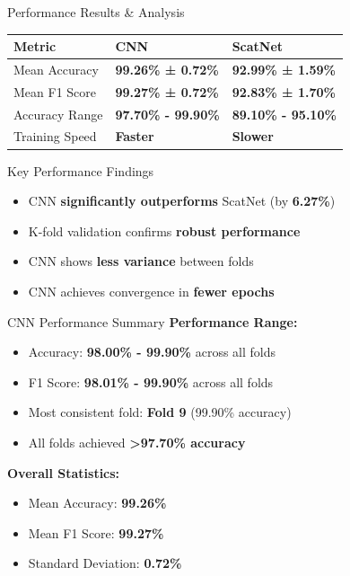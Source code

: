 \documentclass[aspectratio=169,8pt]{beamer}  %
\begin{document}
\begin{frame}{Performance Results \& Analysis}
\begin{table}
\begin{tabular}{lll}
\toprule
Metric & CNN & ScatNet \\
\midrule
Mean Accuracy & \textbf{99.26\% ± 0.72\%} & \textbf{92.99\% ± 1.59\%} \\
Mean F1 Score & \textbf{99.27\% ± 0.72\%} & \textbf{92.83\% ± 1.70\%} \\
Accuracy Range & \textbf{97.70\% - 99.90\%} & \textbf{89.10\% - 95.10\%} \\
Training Speed & \textbf{Faster} & \textbf{Slower} \\
\bottomrule
\end{tabular}
\end{table}

\begin{block}{Key Performance Findings}
\begin{itemize}
\item CNN \textbf{significantly outperforms} ScatNet (by \textbf{6.27\%})
\item K-fold validation confirms \textbf{robust performance}
\item CNN shows \textbf{less variance} between folds
\item CNN achieves convergence in \textbf{fewer epochs}
\end{itemize}
\end{block}
\end{frame}

\begin{frame}{CNN Performance Summary}
\textbf{Performance Range:}
\begin{itemize}
\item Accuracy: \textbf{98.00\% - 99.90\%} across all folds
\item F1 Score: \textbf{98.01\% - 99.90\%} across all folds
\item Most consistent fold: \textbf{Fold 9} (99.90\% accuracy)
\item All folds achieved \textbf{\textgreater{}97.70\% accuracy}
\end{itemize}

\textbf{Overall Statistics:}
\begin{itemize}
\item Mean Accuracy: \textbf{99.26\%}
\item Mean F1 Score: \textbf{99.27\%}
\item Standard Deviation: \textbf{0.72\%}
\end{itemize}
\end{frame}
\end{document}

